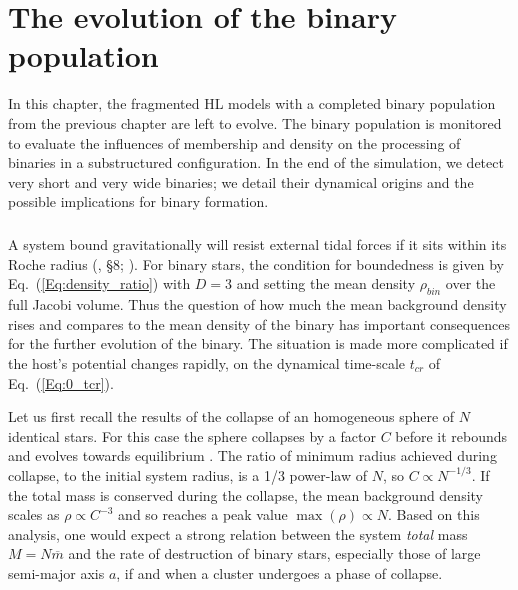 \chapter{The evolution of the binary population}


In this chapter, the fragmented HL models with a completed binary population from the previous chapter are left to evolve. The binary population is monitored to evaluate the influences of membership and density on the processing of binaries in a substructured configuration. In the end of the simulation, we detect very short and very wide binaries; we detail their dynamical origins and the possible implications for binary formation.

\minitoc


\paragraph*{}

A system bound gravitationally will resist external tidal forces if it sits within its Roche radius (\citealt{BT}, \S8; \citealt{Renaud2011}). For binary stars, the condition for boundedness is given by Eq.~(\ref{Eq:density_ratio})  with $D = 3$ and setting the mean density $\rho_{bin}$ over the full Jacobi volume. Thus the question of how much the mean background density rises and  compares to the mean density of the binary has important consequences for the further evolution of the binary. The situation is made more complicated if the host's potential changes rapidly, on the  dynamical time-scale $t_{cr}$ of Eq.~(\ref{Eq:0_tcr}). 

Let us first recall the results of the collapse of an homogeneous sphere of $N$ identical stars. For this case the sphere collapses by a factor $C$ before it rebounds and evolves towards equilibrium \citep{Aarseth1988,Boily2002}. The ratio of minimum radius achieved during collapse, to the initial system radius, is a 1/3 power-law of $N$, so $ C \propto N^{-1/3}$. 
If the total mass is conserved during the collapse, the mean background density scales as $\rho \propto C^{-3}$ and so reaches a peak value $\max(\rho) \propto N$. Based on this analysis, one would expect a strong relation between the system {\it total} mass $M = N \overline{m}$ and the rate of destruction of binary stars, especially those of large semi-major axis $a$, if and when a cluster undergoes a phase of collapse.

